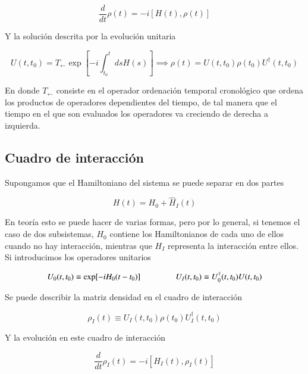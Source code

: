 \begin{equation*}
    \frac{d}{dt}\rho(t) = -i[H(t),\rho(t)]
\end{equation*}

Y la solución descrita por la evolución unitaria 

\begin{equation*}
    U(t,t_{0}) = T_{\leftarrow} \exp \left[ -i \int_{t_{0}}^{t}ds H(s) \right] \implies \rho(t) = U(t,t_{0})\rho(t_{0})U^{\dagger}(t,t_{0})
\end{equation*}

En donde $T_{\leftarrow}$ consiste en el operador ordenación temporal cronológico que ordena los productos de operadores dependientes del tiempo, de tal manera que el tiempo en el que son evaluados los operadores va creciendo de derecha a izquierda.

\subsection{Cuadro de interacción}
Supongamos que el Hamiltoniano del sistema se puede separar en dos partes

\begin{equation*}
    H(t) = H_{0} + \hat{H}_{I}(t)
\end{equation*}

En teoría esto se puede hacer de varias formas, pero por lo general, si tenemos el caso de dos subsistemas, $H_{0}$ contiene los Hamiltonianos de cada uno de ellos cuando no hay interacción, mientras que $H_{I}$ representa la interacción entre ellos. Si introducimos los operadores unitarios

\begin{equation*}
    U_{0}(t,t_{0}) \equiv \exp[-iH_{0}(t-t_{0}) ]  \hspace{15mm} U_{I}(t,t_0) \equiv U^{\dagger}_{0}(t,t_{0})U(t,t_{0})
\end{equation*}

Se puede describir la matriz densidad en el cuadro de interacción

\begin{equation*}
    \rho_{I}(t) \equiv U_{I}(t,t_{0})\rho(t_{0})U^{\dagger}_{I}(t,t_{0})
\end{equation*}

Y la evolución en este cuadro de interacción

\begin{equation}
    \frac{d}{dt}\rho_{I}(t) = -i[H_{I}(t), \rho_{I}(t)]
    \label{sec11:interactionp}
\end{equation}

